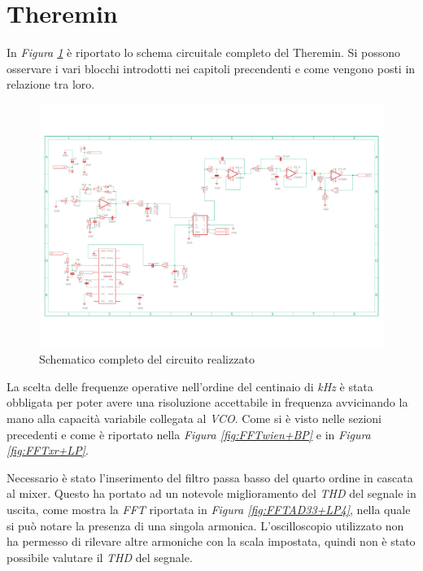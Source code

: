 \documentclass[titlepage]{report}
\begin{document}
\newpage
\section{Theremin}
\label{ch:Teremin}

	In \textit{Figura \ref{fig:Schematico Completo}} è riportato lo schema circuitale completo del Theremin. Si possono osservare i vari blocchi introdotti nei capitoli precendenti e come vengono posti in relazione tra loro.

	\begin{figure}[H]
		\centering
		\includegraphics[scale=0.4]{Immagini/Schematico Completo.pdf}
		\caption{Schematico completo del circuito realizzato}
		\label{fig:Schematico Completo}
	\end{figure}

	\noindent La scelta delle frequenze operative nell'ordine del centinaio di \textit{kHz} è stata obbligata per poter avere una risoluzione accettabile in frequenza avvicinando la mano alla capacità variabile collegata al \textit{VCO}.
	Come si è visto nelle sezioni precedenti e come è riportato nella \textit{Figura \ref{fig:FFTwien+BP}} e in \textit{Figura \ref{fig:FFTxr+LP}}.

	\noindent Necessario è stato l'inserimento del filtro passa basso del quarto ordine in cascata al mixer. Questo ha portato ad un notevole miglioramento del \textit{THD} del segnale in uscita, come mostra la \textit{FFT} riportata in \textit{Figura \ref{fig:FFTAD33+LP4}}, nella quale si può notare la presenza di una singola armonica. L'oscilloscopio utilizzato non ha permesso di rilevare altre armoniche con la scala impostata, quindi non è stato possibile valutare il \textit{THD} del segnale.
	
\end{document}
